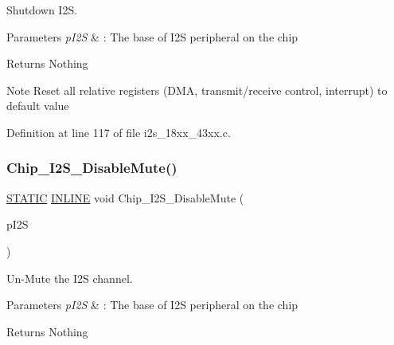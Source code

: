 Shutdown I2S. 


\begin{DoxyParams}{Parameters}
{\em p\+I2S} & \+: The base of I2S peripheral on the chip \\
\hline
\end{DoxyParams}
\begin{DoxyReturn}{Returns}
Nothing 
\end{DoxyReturn}
\begin{DoxyNote}{Note}
Reset all relative registers (D\+MA, transmit/receive control, interrupt) to default value 
\end{DoxyNote}


Definition at line 117 of file i2s\+\_\+18xx\+\_\+43xx.\+c.

\mbox{\label{group___i2_s__18_x_x__43_x_x_ga0c6731695f685fa21678ea3635b458f3}} 
\subsubsection{\texorpdfstring{Chip\+\_\+\+I2\+S\+\_\+\+Disable\+Mute()}{Chip\_I2S\_DisableMute()}}
{\footnotesize\ttfamily \hyperlink{group___l_p_c___types___public___macros_ga10b2d890d871e1489bb02b7e70d9bdfb}{S\+T\+A\+T\+IC} \hyperlink{spifi__18xx__43xx_8h_a2eb6f9e0395b47b8d5e3eeae4fe0c116}{I\+N\+L\+I\+NE} void Chip\+\_\+\+I2\+S\+\_\+\+Disable\+Mute (\begin{DoxyParamCaption}\item[{\hyperlink{struct_l_p_c___i2_s___t}{L\+P\+C\+\_\+\+I2\+S\+\_\+T} $\ast$}]{p\+I2S }\end{DoxyParamCaption})}



Un-\/\+Mute the I2S channel. 


\begin{DoxyParams}{Parameters}
{\em p\+I2S} & \+: The base of I2S peripheral on the chip \\
\hline
\end{DoxyParams}
\begin{DoxyReturn}{Returns}
Nothing 
\end{DoxyReturn}


